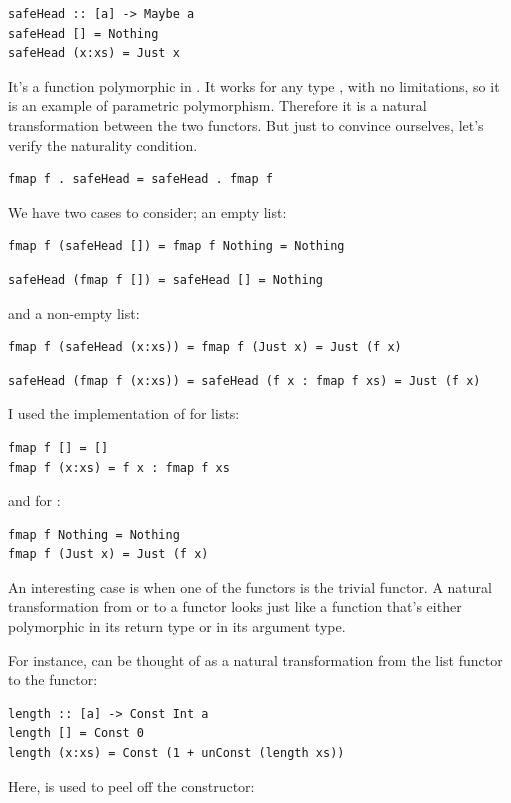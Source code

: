 \begin{verbatim}
safeHead :: [a] -> Maybe a
safeHead [] = Nothing
safeHead (x:xs) = Just x
\end{verbatim}
It's a function polymorphic in . It works for any type
, with no limitations, so it is an example of parametric
polymorphism. Therefore it is a natural transformation between the two
functors. But just to convince ourselves, let's verify the naturality
condition.

\begin{verbatim}
fmap f . safeHead = safeHead . fmap f
\end{verbatim}
We have two cases to consider; an empty list:

\begin{verbatim}
fmap f (safeHead []) = fmap f Nothing = Nothing
\end{verbatim}

\begin{verbatim}
safeHead (fmap f []) = safeHead [] = Nothing
\end{verbatim}
and a non-empty list:

\begin{verbatim}
fmap f (safeHead (x:xs)) = fmap f (Just x) = Just (f x)
\end{verbatim}
\begin{verbatim}
safeHead (fmap f (x:xs)) = safeHead (f x : fmap f xs) = Just (f x)
\end{verbatim}
I used the implementation of  for lists:

\begin{verbatim}
fmap f [] = []
fmap f (x:xs) = f x : fmap f xs
\end{verbatim}
and for :

\begin{verbatim}
fmap f Nothing = Nothing
fmap f (Just x) = Just (f x)
\end{verbatim}
An interesting case is when one of the functors is the trivial
 functor. A natural transformation from or to a
 functor looks just like a function that's either
polymorphic in its return type or in its argument type.

For instance,  can be thought of as a natural
transformation from the list functor to the  functor:

\begin{verbatim}
length :: [a] -> Const Int a
length [] = Const 0
length (x:xs) = Const (1 + unConst (length xs))
\end{verbatim}
Here,  is used to peel off the 
constructor:

